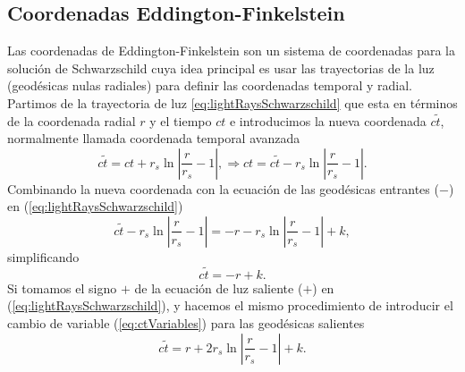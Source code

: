\subsection{Coordenadas Eddington-Finkelstein}
Las coordenadas de Eddington-Finkelstein son un sistema de coordenadas para la solución de Schwarzschild cuya idea principal es usar las trayectorias de la luz (geodésicas nulas radiales) para definir las coordenadas temporal y radial.
Partimos de la trayectoria de luz \ref{eq:lightRaysSchwarzschild} que esta en términos de la coordenada radial \( r \) y el tiempo \( ct \) e introducimos la nueva coordenada \( c\tilde{t} \), normalmente llamada coordenada temporal avanzada
\begin{equation}
    c\tilde{t}  = ct + r_s \ln \left| \frac{r}{r_s} - 1 \right|,      \Rightarrow
    ct         = c\tilde{t} - r_s \ln \left| \frac{r}{r_s} - 1 \right|.
    \label{eq:ctVariables}
\end{equation}
Combinando la nueva coordenada con la ecuación de las geodésicas entrantes (\( - \)) en (\ref{eq:lightRaysSchwarzschild})
\begin{equation}
    c\tilde{t} - r_s \ln \left| \frac{r}{r_s} - 1 \right| = -r - r_s \ln \left| \frac{r}{r_s} - 1 \right| + k,
\end{equation}
simplificando
\begin{equation}
    c\tilde{t} = -r + k  .
    \label{eq:ctVariablesIn}
\end{equation}
Si tomamos el signo \( + \) de la ecuación de luz saliente (\( + \)) en (\ref{eq:lightRaysSchwarzschild}), y hacemos el mismo procedimiento de introducir el cambio de variable (\ref{eq:ctVariables}) para las geodésicas salientes
\begin{equation}
    c\tilde{t} = r + 2 r_s \ln \left| \frac{r}{r_s} - 1 \right| + k.
\end{equation}

